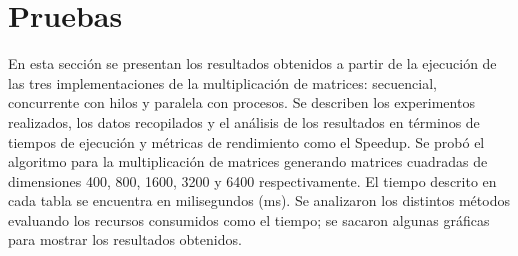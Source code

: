 

\section{Pruebas}
\label{sec:Pruebas}

En esta sección se presentan los resultados obtenidos a partir de la ejecución de las tres implementaciones de la multiplicación de matrices: secuencial, concurrente con hilos y paralela con procesos. Se describen los experimentos realizados, los datos recopilados y el análisis de los resultados en términos de tiempos de ejecución y métricas de rendimiento como el Speedup.
Se probó el algoritmo para la multiplicación de matrices generando matrices cuadradas de dimensiones 400, 800, 1600, 3200 y 6400 respectivamente. El tiempo descrito en cada tabla se encuentra en milisegundos (ms). Se analizaron los distintos métodos evaluando los recursos consumidos como el tiempo; se sacaron algunas gráficas para mostrar los resultados obtenidos. 










